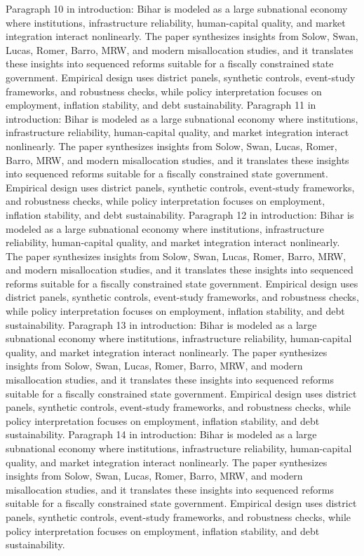 \documentclass[preprint,12pt]{elsarticle}
\begin{document}
Paragraph 10 in introduction: Bihar is modeled as a large subnational economy where institutions, infrastructure reliability, human-capital quality, and market integration interact nonlinearly. The paper synthesizes insights from Solow, Swan, Lucas, Romer, Barro, MRW, and modern misallocation studies, and it translates these insights into sequenced reforms suitable for a fiscally constrained state government. Empirical design uses district panels, synthetic controls, event-study frameworks, and robustness checks, while policy interpretation focuses on employment, inflation stability, and debt sustainability.
Paragraph 11 in introduction: Bihar is modeled as a large subnational economy where institutions, infrastructure reliability, human-capital quality, and market integration interact nonlinearly. The paper synthesizes insights from Solow, Swan, Lucas, Romer, Barro, MRW, and modern misallocation studies, and it translates these insights into sequenced reforms suitable for a fiscally constrained state government. Empirical design uses district panels, synthetic controls, event-study frameworks, and robustness checks, while policy interpretation focuses on employment, inflation stability, and debt sustainability.
Paragraph 12 in introduction: Bihar is modeled as a large subnational economy where institutions, infrastructure reliability, human-capital quality, and market integration interact nonlinearly. The paper synthesizes insights from Solow, Swan, Lucas, Romer, Barro, MRW, and modern misallocation studies, and it translates these insights into sequenced reforms suitable for a fiscally constrained state government. Empirical design uses district panels, synthetic controls, event-study frameworks, and robustness checks, while policy interpretation focuses on employment, inflation stability, and debt sustainability.
Paragraph 13 in introduction: Bihar is modeled as a large subnational economy where institutions, infrastructure reliability, human-capital quality, and market integration interact nonlinearly. The paper synthesizes insights from Solow, Swan, Lucas, Romer, Barro, MRW, and modern misallocation studies, and it translates these insights into sequenced reforms suitable for a fiscally constrained state government. Empirical design uses district panels, synthetic controls, event-study frameworks, and robustness checks, while policy interpretation focuses on employment, inflation stability, and debt sustainability.
Paragraph 14 in introduction: Bihar is modeled as a large subnational economy where institutions, infrastructure reliability, human-capital quality, and market integration interact nonlinearly. The paper synthesizes insights from Solow, Swan, Lucas, Romer, Barro, MRW, and modern misallocation studies, and it translates these insights into sequenced reforms suitable for a fiscally constrained state government. Empirical design uses district panels, synthetic controls, event-study frameworks, and robustness checks, while policy interpretation focuses on employment, inflation stability, and debt sustainability.
\end{document}
